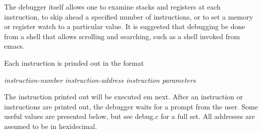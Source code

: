 \documentclass[11pt]{article}
\begin{document}
The debugger itself allows one to examine stacks and registers at each
instruction, to skip ahead a specified number of instructions, or to
set a memory or register watch to a particular value.  It is suggested
that debugging be done from a shell that allows scrolling and
searching, such as a shell invoked from emacs.

Each instruction is prinded out in the format
\begin{center}
{\em instruction-number instruction-address  instruction  parameters}
\end{center}
The instruction printed out will be executed {em next}.  After an
instruction or instructions are printed out, the debugger waits for a
prompt from the user.  Some useful values are presented below, but see
debug.c for a full set.  All addresses are assumed to be in
hexidecimal.
\end{document}
